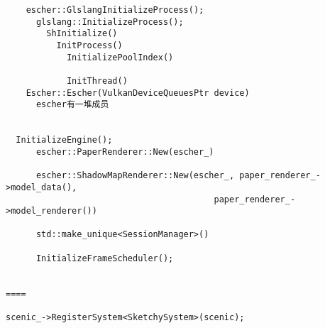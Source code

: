 \begin{verbatim}
    escher::GlslangInitializeProcess();
      glslang::InitializeProcess();
        ShInitialize()
          InitProcess()
            InitializePoolIndex()

            InitThread()
    Escher::Escher(VulkanDeviceQueuesPtr device)
      escher有一堆成员


  InitializeEngine();
      escher::PaperRenderer::New(escher_)

      escher::ShadowMapRenderer::New(escher_, paper_renderer_->model_data(),
                                         paper_renderer_->model_renderer())

      std::make_unique<SessionManager>()

      InitializeFrameScheduler();


====

scenic_->RegisterSystem<SketchySystem>(scenic);





\end{verbatim}